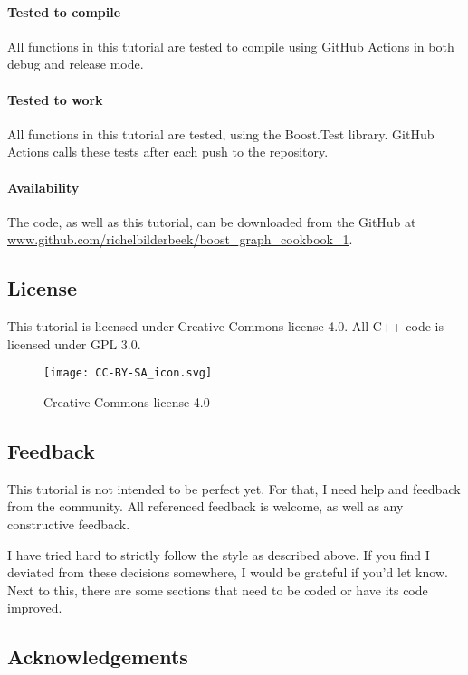 \paragraph{Tested to compile}

All functions in this tutorial are tested to compile using GitHub Actions in
both debug and release mode.

\paragraph{Tested to work}

All functions in this tutorial are tested, using the Boost.Test library.
GitHub Actions calls these tests after each push to the repository.

\paragraph{Availability}

The code, as well as this tutorial, can be downloaded from the GitHub at
\url{www.github.com/richelbilderbeek/boost_graph_cookbook_1}.

\subsection{License}

This tutorial is licensed under Creative Commons license 4.0.
All C++ code is licensed under GPL 3.0.

\begin{figure}[!htbp]
  \texttt{[image: CC-BY-SA\_icon.svg]}
  \caption{
    Creative Commons license 4.0
  }
  \label{fig:license}
\end{figure}

\subsection{Feedback}

This tutorial is not intended to be perfect yet.
For that, I need help and feedback from the community.
All referenced feedback is welcome, as well as any constructive feedback.

I have tried hard to strictly follow the style as described above.
If you find I deviated from these decisions somewhere, I would be grateful
if you'd let know.
Next to this, there are some sections that need to be coded or have its
code improved.

\subsection{Acknowledgements}


